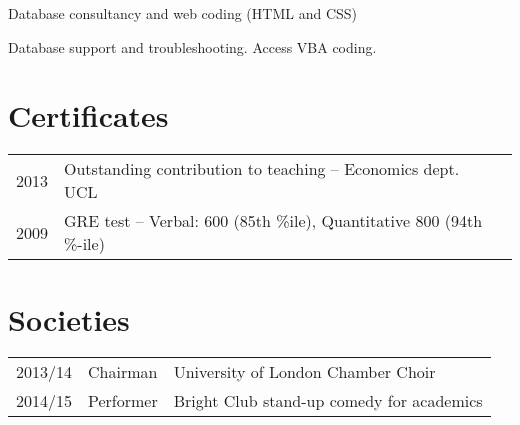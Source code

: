 \documentclass[a4paper,nomath]{deedy-resume} %
\begin{document}
\begin{paracol}{2}
    \begin{tightitemize}
        \item Database consultancy and web coding (HTML and CSS)
    \end{tightitemize}

    \sectionspace %
    


    \begin{tightitemize}
        \item Database support and troubleshooting. Access VBA coding.
    \end{tightitemize}

    \sectionspace %

    \section{Certificates} 

    \begin{tabular}{rll}
        2013     & Outstanding contribution to teaching -- Economics dept. UCL\\
        2009     & GRE test -- Verbal: 600 (85th \%ile), Quantitative 800 (94th \%-ile) \\
    \end{tabular}

    \sectionspace %


    \section{Societies} 

    \begin{tabular}{rll}
        2013/14 & Chairman & University of London Chamber Choir\\
        2014/15 & Performer & Bright Club stand-up comedy for academics\\
    \end{tabular}


\end{paracol}
\end{document}
